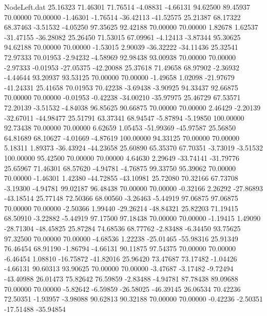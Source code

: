 \begin{filecontents}{NodeLeft.dat}
  25.16323   71.46301   71.76514    -4.08831   -4.66131   94.62500   89.45937   70.00000   70.00000   -1.46301   -1.76514  -36.42113  -41.52575
  25.21387   68.17322   68.37463    -3.51532   -4.05250   97.35625   92.42188   70.00000   70.00000    1.82678    1.62537  -31.47155  -36.28082
  25.26450   71.53015   67.09961    -4.12413   -3.87344   95.30625   94.62188   70.00000   70.00000   -1.53015    2.90039  -36.32222  -34.11436
  25.32541   72.97333   70.01953    -2.94232   -4.58969   92.98438   93.00938   70.00000   70.00000   -2.97333   -0.01953  -27.05375  -42.20088
  25.37618   71.49658   68.97902    -2.36932   -4.44644   93.20937   93.53125   70.00000   70.00000   -1.49658    1.02098  -21.97679  -41.24331
  25.41658   70.01953   70.42238    -3.69438   -3.90925   94.33437   92.66875   70.00000   70.00000   -0.01953   -0.42238  -34.00210  -35.97975
  25.46729   67.53571   72.20139    -3.51532   -4.84038   96.85625   90.66875   70.00000   70.00000    2.46429   -2.20139  -32.67011  -44.98477
  25.51791   63.37341   68.94547    -5.87894   -5.19850  100.00000   92.73438   70.00000   70.00000    6.62659    1.05453  -51.99369  -45.97587
  25.56850   64.81689   68.10627    -4.01669   -4.87619  100.00000   94.33125   70.00000   70.00000    5.18311    1.89373  -36.43924  -44.23658
  25.60890   65.35370   67.70351    -3.73019   -3.51532  100.00000   95.42500   70.00000   70.00000    4.64630    2.29649  -33.74141  -31.79776
  25.65967   71.46301   68.57620    -4.94781   -4.76875   99.33750   95.39062   70.00000   70.00000   -1.46301    1.42380  -44.72855  -43.10981
  25.72080   70.32166   67.73708    -3.19300   -4.94781   99.02187   96.48438   70.00000   70.00000   -0.32166    2.26292  -27.86893  -43.18514
  25.77148   72.50366   68.00560    -3.26463   -5.44919   97.06875   97.06875   70.00000   70.00000   -2.50366    1.99440  -29.26214  -48.84321
  25.82203   71.19415   68.50910    -3.22882   -5.44919   97.17500   97.18438   70.00000   70.00000   -1.19415    1.49090  -28.71304  -48.45825
  25.87284   74.68536   68.77762    -2.83488   -6.34450   93.75625   97.32500   70.00000   70.00000   -4.68536    1.22238  -25.01465  -55.98316
  25.91349   76.46454   68.91190    -1.86794   -4.66131   90.11875   97.54375   70.00000   70.00000   -6.46454    1.08810  -16.75872  -41.82016
  25.96420   73.47687   73.17482    -1.04426   -4.66131   90.60313   93.90625   70.00000   70.00000   -3.47687   -3.17482   -9.72494  -43.40988
  26.01473   75.82642   76.59859    -2.83488   -4.94781   87.78438   89.09688   70.00000   70.00000   -5.82642   -6.59859  -26.58025  -46.39145
  26.06534   70.42236   72.50351    -1.93957   -3.98088   90.62813   90.32188   70.00000   70.00000   -0.42236   -2.50351  -17.51488  -35.94854

\end{filecontents}
